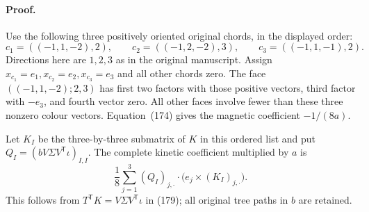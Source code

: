 \documentclass[11pt]{article}
\begin{document}
\paragraph{Proof.}
Use the following three positively oriented original chords, in the
displayed order:
\[
 c_1=((-1,1,-2),2),\qquad c_2=((-1,2,-2),3),\qquad
 c_3=((-1,1,-1),2).
\]
Directions here are $1,2,3$ as in the original manuscript. Assign
$x_{c_1}=e_1,x_{c_2}=e_2,x_{c_3}=e_3$ and all other chords zero.
The face $((-1,1,-2);2,3)$ has first two factors with those positive
vectors, third factor with $-e_3$, and fourth vector zero. All other
faces involve fewer than these three nonzero colour vectors.
Equation~(174) gives the magnetic coefficient
$-1/(8a)$.

Let $K_I$ be the three-by-three submatrix of $K$ in this ordered
list and put $Q_I=(bV\Sigma V^{\mathsf T}\iota)_{I,I}$.
The complete kinetic coefficient multiplied by $a$ is
\begin{equation}\label{eq:vertex-certificate-contraction}
 \frac18\sum_{j=1}^3(Q_I)_{j,\cdot}
                   \cdot\bigl(e_j\times(K_I)_{j,\cdot}\bigr).
\end{equation}
This follows from $T^{\mathsf T}K=V\Sigma V^{\mathsf T}\iota$
in (179); all original tree paths in
$b$ are retained.
\end{document}
